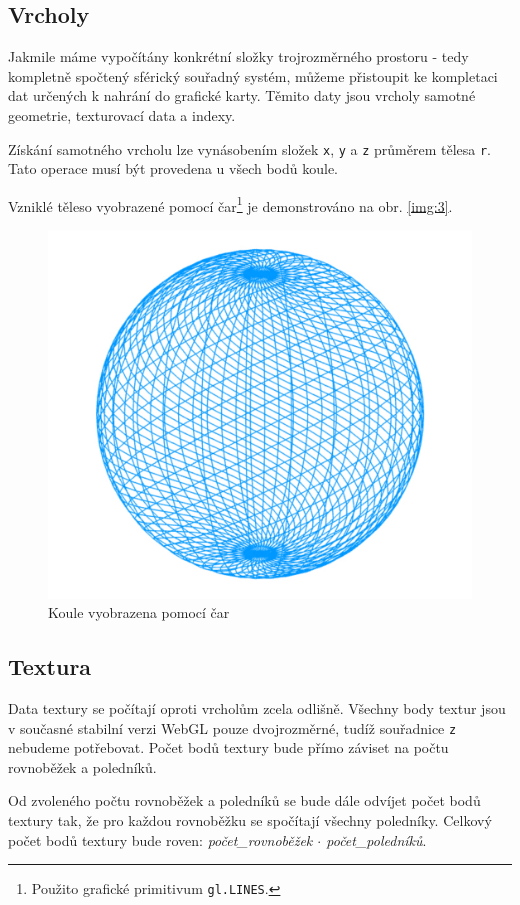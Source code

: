 \newpage


\subsection{Vrcholy}
Jakmile máme vypočítány konkrétní složky trojrozměrného prostoru - tedy kompletně spočtený sférický souřadný systém, můžeme přistoupit ke kompletaci dat určených k nahrání do grafické karty. Těmito daty jsou vrcholy samotné geometrie, texturovací data a indexy. 

Získání samotného vrcholu lze vynásobením složek \texttt{x}, \texttt{y} a \texttt{z} průměrem tělesa \texttt{r}. Tato operace musí být provedena u všech bodů koule.

Vzniklé těleso vyobrazené pomocí čar\footnote{Použito grafické primitivum \texttt{gl.LINES}.} je demonstrováno na obr. \ref{img:3}.


\begin{figure}[h]
	\label{img:3}
	\centering
	\includegraphics[scale=1.0,angle=0,width=0.55\linewidth]{obrazky-figures/vertex}
	\caption{Koule vyobrazena pomocí čar}
	\label{fig:geom2}
\end{figure}


\subsection{Textura}
Data textury se počítají oproti vrcholům zcela odlišně. Všechny body textur jsou v současné stabilní verzi WebGL pouze dvojrozměrné, tudíž souřadnice \texttt{z} nebudeme potřebovat.
Počet bodů textury bude přímo záviset na počtu rovnoběžek a poledníků.

Od zvoleného počtu rovnoběžek a poledníků se bude dále odvíjet počet bodů textury tak, že pro každou rovnoběžku se spočítají všechny poledníky. Celkový počet bodů textury bude roven: \textit{počet\_rovnoběžek $\cdot$ počet\_poledníků}.

